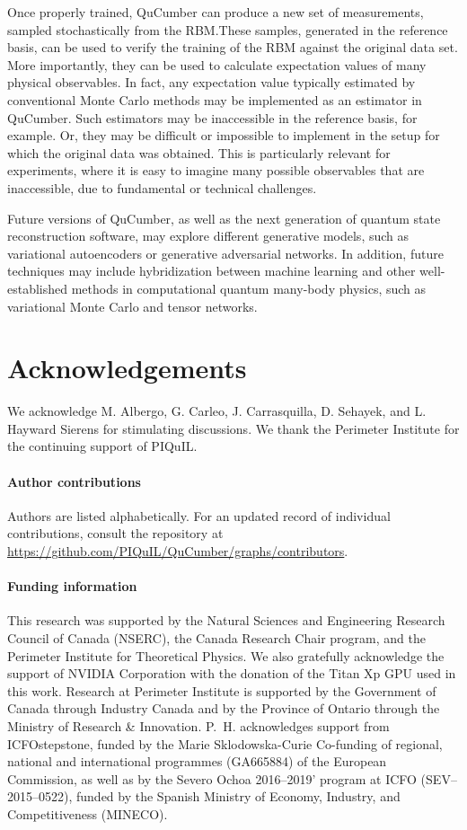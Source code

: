 \documentclass[submission, Phys, hidelnks]{SciPost}
\begin{document}
Once properly trained, QuCumber can produce a new set of measurements,
sampled stochastically from the RBM.\@ These samples, generated in the
reference basis, can be used to verify the training of the RBM against the
original data set. More importantly, they can be used to calculate expectation
values of many physical observables. In fact, any expectation value typically
estimated by conventional Monte Carlo methods may be implemented as an
estimator in QuCumber. Such estimators may be inaccessible in the reference
basis, for example. Or, they may be difficult or impossible to implement in the
setup for which the original data was obtained.  This is particularly relevant
for experiments, where it is easy to imagine many possible observables that are
inaccessible, due to fundamental or technical challenges.

Future versions of QuCumber, as well as the next generation of quantum state
reconstruction software, may explore different generative models, such as
variational autoencoders or generative adversarial networks.
In addition, future techniques may include hybridization between machine
learning and other well-established methods in computational quantum many-body
physics, such as variational Monte Carlo and tensor networks.

\section*{Acknowledgements}
We acknowledge M. Albergo, G. Carleo, J. Carrasquilla, D. Sehayek, and
L. Hayward Sierens for stimulating discussions.
We thank the Perimeter Institute for the continuing support of PIQuIL.\@

\paragraph{Author contributions}
Authors are listed alphabetically. For an updated record of individual
contributions, consult the repository
at \url{https://github.com/PIQuIL/QuCumber/graphs/contributors}.

\paragraph{Funding information}

This research was supported by the Natural Sciences and Engineering
Research Council of Canada (NSERC), the
Canada Research Chair program, and the Perimeter Institute
for Theoretical Physics. We also gratefully
acknowledge the support of NVIDIA Corporation with
the donation of the Titan Xp GPU used in this work.
Research at Perimeter Institute is supported by the Government
of Canada through Industry Canada and by the
Province of Ontario through the Ministry of Research \&
Innovation. P.~H. acknowledges support from ICFOstepstone,
funded by the Marie Sklodowska-Curie Co-funding of regional,
national and international programmes (GA665884) of the European
Commission, as well as by the Severo Ochoa 2016{--}2019' program at
ICFO (SEV{--}2015{--}0522), funded by the Spanish Ministry of Economy,
 Industry, and Competitiveness (MINECO).
\end{document}
